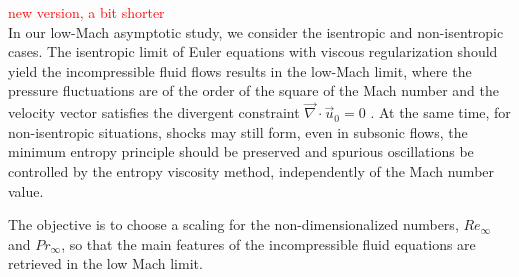 \documentclass[preprint,10pt]{elsarticle}
\renewcommand{\div}{\vec{\nabla}\! \cdot \!}
\newcommand{\tcr}[1]{\textcolor{red}{#1}}
\begin{document}
\tcr{new version, a bit shorter\\}
In our low-Mach asymptotic study, we consider the isentropic and non-isentropic cases. The isentropic limit of Euler equations with viscous regularization should yield the incompressible fluid flows results in the low-Mach limit, where the pressure fluctuations are of the order of the square of the Mach number and the velocity vector satisfies the divergent constraint $\div \vec{u}_0 = 0$ \cite{many}. At the same time, for non-isentropic situations, shocks may still form, even in subsonic flows, the minimum entropy principle should be preserved and spurious oscillations be controlled by the entropy viscosity method, independently of the Mach number value.

The objective is to choose a scaling for the non-dimensionalized numbers, $Re_\infty$ and $Pr_\infty$, so that the main features of the incompressible fluid equations are retrieved in the low Mach limit.
\end{document}
